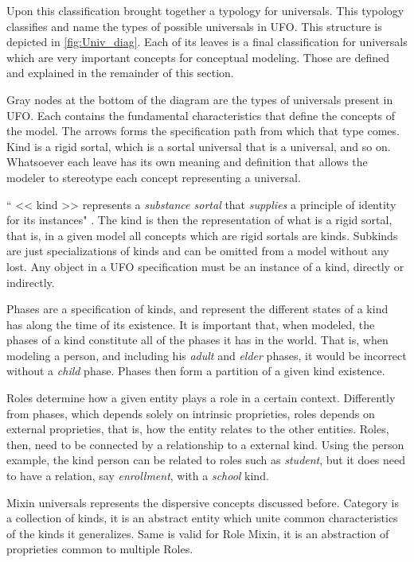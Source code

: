 Upon this classification \citeauthor{guizzardi_ontological_2005} brought together a typology for universals. This typology classifies and name the types of possible universals in UFO. This structure is depicted in \autoref{fig:Univ_diag}. Each of its leaves is a final classification for universals which are very important concepts for conceptual modeling. Those are defined and explained in the remainder of this section.



Gray nodes at the bottom of the diagram are the types of universals present in UFO. Each contains the fundamental characteristics that define the concepts of the model. The arrows forms the specification path from which that type comes. Kind is a rigid sortal, which is a sortal universal that is a universal, and so on. Whatsoever each leave has its own meaning and definition that allows the modeler to stereotype each concept representing a universal.

`` << kind >> represents a \textit{substance sortal} that \textit{supplies} a principle of identity for its instances" \citep{guizzardi_ontological_2005}. The kind is then the representation of what is a rigid sortal, that is, in a given model all concepts which are rigid sortals are kinds. Subkinds are just specializations of kinds and can be omitted from a model without any lost. Any object in a UFO specification must be an instance of a kind, directly or indirectly.

Phases are a specification of kinds, and represent the different states of a kind has along the time of its existence. It is important that, when modeled, the phases of a kind constitute all of the phases it has in the world. That is, when modeling a person, and including his \textit{adult} and \textit{elder} phases, it would be incorrect without a \textit{child} phase. Phases then form a partition of a given kind existence.

Roles determine how a given entity plays a role in a certain context. Differently from phases, which depends solely on intrinsic proprieties, roles depends on external proprieties, that is, how the entity relates to the other entities. Roles, then, need to be connected by a relationship to a external  kind. Using the person example, the kind person can be related to roles such as \textit{student}, but it does need to have a relation, say \textit{enrollment}, with a \textit{school} kind. 

Mixin universals represents the dispersive concepts discussed before. Category is a collection of kinds, it is an abstract entity which unite common characteristics of the kinds it generalizes. Same is valid for Role Mixin, it is an abstraction of proprieties common to multiple Roles. 

